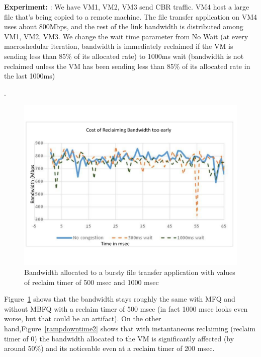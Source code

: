 {\bf Experiment:} : We have VM1, VM2, VM3 send CBR traffic. VM4 host a large
file that's being copied to a remote machine.  The file transfer application on
VM4 uses about 800Mbps, and the rest of the link bandwidth is distributed among
VM1, VM2, VM3.  We change the wait time parameter from No Wait (at every
macroshedular iteration, bandwidth is immediately reclaimed if the VM is
sending less than 85\% of its allocated rate) to 1000ms wait (bandwidth is not
reclaimed unless the VM has been sending less than 85\% of its allocated rate in
the last 1000ms)

.
\begin{figure}[h]
\centering
\includegraphics[width=\columnwidth,trim=60pt 20mm 0pt 8mm]{figures/rampdowntime1}
\caption{Bandwidth allocated to a bursty file transfer application with values of reclaim timer of 500 msec and 1000 msec}
\label{rampdowntime1}
\vspace{-3mm}
\end{figure}

Figure~\ref{rampdowntime1} shows that the bandwidth stays roughly the same with
MFQ and without MBFQ with a reclaim timer of 500 msec (in fact 1000 msec looks
even worse, but that could be an artifact).   On the other
hand,Figure~\ref{rampdowntime2} shows that with instantaneous reclaiming
(reclaim timer of 0) the bandwidth allocated to the VM is significantly affected
(by around 50\%) and its noticeable even at a reclaim timer of 200 msec.

